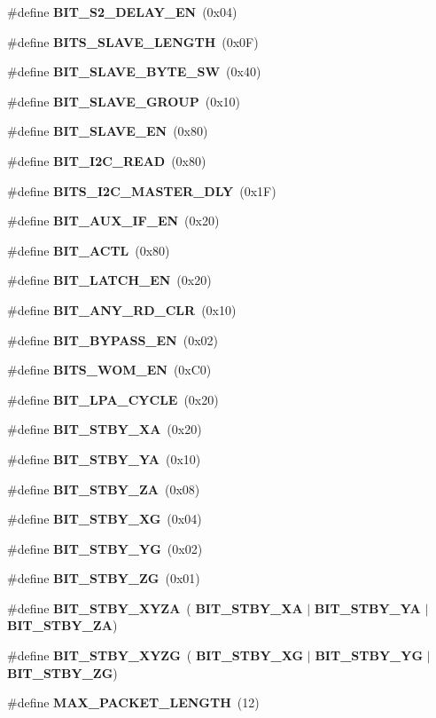 \begin{DoxyCompactItemize}
\#define \textbf{ B\+I\+T\+\_\+\+S2\+\_\+\+D\+E\+L\+A\+Y\+\_\+\+EN}~(0x04)
\item 
\#define \textbf{ B\+I\+T\+S\+\_\+\+S\+L\+A\+V\+E\+\_\+\+L\+E\+N\+G\+TH}~(0x0\+F)
\item 
\#define \textbf{ B\+I\+T\+\_\+\+S\+L\+A\+V\+E\+\_\+\+B\+Y\+T\+E\+\_\+\+SW}~(0x40)
\item 
\#define \textbf{ B\+I\+T\+\_\+\+S\+L\+A\+V\+E\+\_\+\+G\+R\+O\+UP}~(0x10)
\item 
\#define \textbf{ B\+I\+T\+\_\+\+S\+L\+A\+V\+E\+\_\+\+EN}~(0x80)
\item 
\#define \textbf{ B\+I\+T\+\_\+\+I2\+C\+\_\+\+R\+E\+AD}~(0x80)
\item 
\#define \textbf{ B\+I\+T\+S\+\_\+\+I2\+C\+\_\+\+M\+A\+S\+T\+E\+R\+\_\+\+D\+LY}~(0x1\+F)
\item 
\#define \textbf{ B\+I\+T\+\_\+\+A\+U\+X\+\_\+\+I\+F\+\_\+\+EN}~(0x20)
\item 
\#define \textbf{ B\+I\+T\+\_\+\+A\+C\+TL}~(0x80)
\item 
\#define \textbf{ B\+I\+T\+\_\+\+L\+A\+T\+C\+H\+\_\+\+EN}~(0x20)
\item 
\#define \textbf{ B\+I\+T\+\_\+\+A\+N\+Y\+\_\+\+R\+D\+\_\+\+C\+LR}~(0x10)
\item 
\#define \textbf{ B\+I\+T\+\_\+\+B\+Y\+P\+A\+S\+S\+\_\+\+EN}~(0x02)
\item 
\#define \textbf{ B\+I\+T\+S\+\_\+\+W\+O\+M\+\_\+\+EN}~(0x\+C0)
\item 
\#define \textbf{ B\+I\+T\+\_\+\+L\+P\+A\+\_\+\+C\+Y\+C\+LE}~(0x20)
\item 
\#define \textbf{ B\+I\+T\+\_\+\+S\+T\+B\+Y\+\_\+\+XA}~(0x20)
\item 
\#define \textbf{ B\+I\+T\+\_\+\+S\+T\+B\+Y\+\_\+\+YA}~(0x10)
\item 
\#define \textbf{ B\+I\+T\+\_\+\+S\+T\+B\+Y\+\_\+\+ZA}~(0x08)
\item 
\#define \textbf{ B\+I\+T\+\_\+\+S\+T\+B\+Y\+\_\+\+XG}~(0x04)
\item 
\#define \textbf{ B\+I\+T\+\_\+\+S\+T\+B\+Y\+\_\+\+YG}~(0x02)
\item 
\#define \textbf{ B\+I\+T\+\_\+\+S\+T\+B\+Y\+\_\+\+ZG}~(0x01)
\item 
\#define \textbf{ B\+I\+T\+\_\+\+S\+T\+B\+Y\+\_\+\+X\+Y\+ZA}~(\textbf{ B\+I\+T\+\_\+\+S\+T\+B\+Y\+\_\+\+XA} $\vert$ \textbf{ B\+I\+T\+\_\+\+S\+T\+B\+Y\+\_\+\+YA} $\vert$ \textbf{ B\+I\+T\+\_\+\+S\+T\+B\+Y\+\_\+\+ZA})
\item 
\#define \textbf{ B\+I\+T\+\_\+\+S\+T\+B\+Y\+\_\+\+X\+Y\+ZG}~(\textbf{ B\+I\+T\+\_\+\+S\+T\+B\+Y\+\_\+\+XG} $\vert$ \textbf{ B\+I\+T\+\_\+\+S\+T\+B\+Y\+\_\+\+YG} $\vert$ \textbf{ B\+I\+T\+\_\+\+S\+T\+B\+Y\+\_\+\+ZG})
\item 
\#define \textbf{ M\+A\+X\+\_\+\+P\+A\+C\+K\+E\+T\+\_\+\+L\+E\+N\+G\+TH}~(12)
\end{DoxyCompactItemize}
